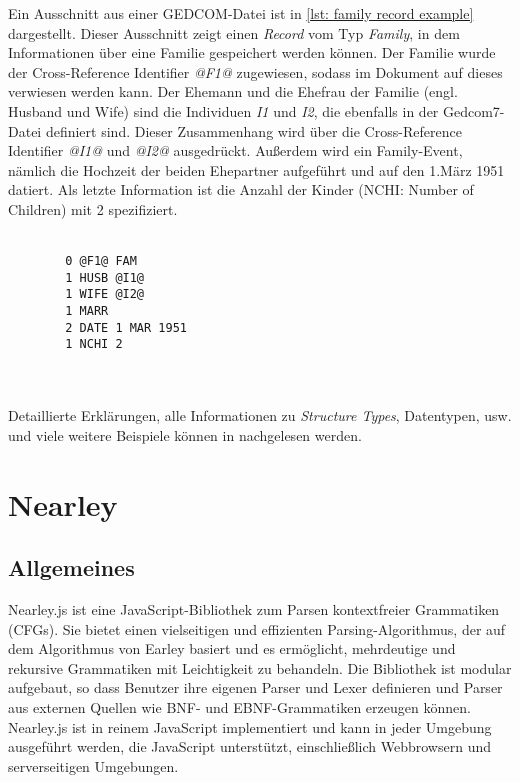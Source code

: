 Ein Ausschnitt aus einer GEDCOM-Datei ist in \ref{lst: family record example} dargestellt. Dieser Ausschnitt zeigt einen \textit{Record} vom Typ \textit{Family}, in dem Informationen über eine Familie gespeichert werden können. Der Familie wurde der Cross-Reference Identifier \textit{@F1@} zugewiesen, sodass im Dokument auf dieses verwiesen werden kann. Der Ehemann und die Ehefrau der Familie (engl. Husband und Wife) sind die Individuen \textit{I1} und \textit{I2}, die ebenfalls in der Gedcom7-Datei definiert sind. Dieser Zusammenhang wird über die Cross-Reference Identifier \textit{@I1@} und \textit{@I2@} ausgedrückt. Außerdem wird ein Family-Event, nämlich die Hochzeit der beiden Ehepartner aufgeführt und auf den 1.März 1951 datiert. Als letzte Information ist die Anzahl der Kinder (NCHI: Number of Children) mit 2 spezifiziert.
\\ \\
\begin{minipage}{1.0\textwidth} \small
	\begin{lstlisting}
		0 @F1@ FAM
		1 HUSB @I1@
		1 WIFE @I2@
		1 MARR
		2 DATE 1 MAR 1951
		1 NCHI 2
	\end{lstlisting}
	\label{lst: family record example}
\end{minipage}
\\ \\
Detaillierte Erklärungen, alle Informationen zu \textit{Structure Types}, Datentypen, usw. und viele weitere Beispiele können in \cite{GEDCOM} nachgelesen werden.


\section{Nearley}
\label{sec: Nearley}
\subsection*{Allgemeines}
Nearley.js ist eine JavaScript-Bibliothek zum Parsen kontextfreier Grammatiken (CFGs). Sie bietet einen vielseitigen und effizienten Parsing-Algorithmus, 
der auf dem Algorithmus von Earley basiert und es ermöglicht, mehrdeutige und rekursive Grammatiken mit Leichtigkeit zu behandeln. Die Bibliothek ist 
modular aufgebaut, so dass Benutzer ihre eigenen Parser und Lexer definieren und Parser aus externen Quellen wie BNF- und EBNF-Grammatiken erzeugen können. 
Nearley.js ist in reinem JavaScript implementiert und kann in jeder Umgebung ausgeführt werden, die JavaScript unterstützt, einschließlich Webbrowsern und 
serverseitigen Umgebungen.

